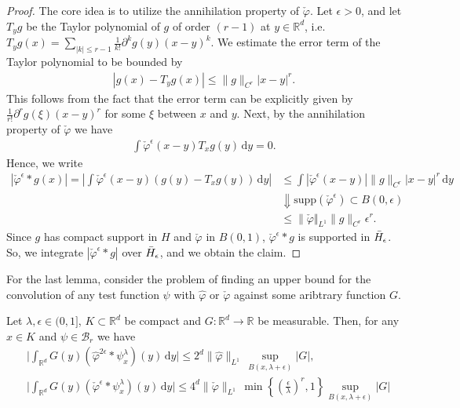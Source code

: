 \begin{proof}
The core idea is to utilize the annihilation property of \(\check \varphi\). Let \(\epsilon > 0\), and let \(T_y g\) be the Taylor polynomial of \(g\) of order \((r-1)\) at \(y \in \mathbb{R}^d\), i.e. \(T_y g(x) = \sum\limits_{|k| \leq r - 1}\frac{1}{k!}\partial^k g(y)(x-y)^k\). We estimate the error term of the Taylor polynomial to be bounded by 
\begin{align*}
    |g(x) - T_y g(x)| \leq \lVert g \rVert_{C^r} |x-y|^r.
\end{align*}
This follows from the fact that the error term can be explicitly given by \(\frac{1}{r!}\partial^{r}g(\xi)(x - y)^r\) for some \(\xi\) between \(x\) and \(y\). Next, by the annihilation property of \(\check \varphi\) we have 
\begin{align*}
    \int\check \varphi^{\epsilon}(x - y)T_{x} g(y)  \, \mathrm{d}y = 0.
\end{align*}
Hence, we write 
\begin{align*}
        |\check \varphi^{\epsilon}* g(x)|  = \left|  \int\check \varphi^{\epsilon}(x - y) (g(y) - T_x g(y) )  \, \mathrm{d}y \right|
        &\leq \int |\check \varphi^{ \epsilon }(x-y)| \lVert g \rVert_{C^r} |x-y|^r \, \mathrm{d}y \\
        &\Downarrow \text{\(\mathrm{supp}(\check \varphi^{\epsilon}) \subset B(0,\epsilon)\)} \\
        &\leq \lVert \check \varphi \Vert_{L^1 } \lVert g \rVert_{C^r} \epsilon^r.
\end{align*}
Since \(g\) has compact support in \(H\) and \(\check \varphi\) in \(B(0,1)\), \(\check \varphi^{\epsilon}* g\) is supported in \(\bar{H}_{\epsilon}\). So, we integrate \(|\check \varphi^{\epsilon}* g|\) over \(\bar{H}_{\epsilon}\), and we obtain the claim.
\end{proof}

For the last lemma, consider the problem of finding an upper bound for the convolution of any test function \(\psi\) with \(\hat \varphi\) or \(\check \varphi\) against some aribtrary function \(G\).   

\begin{lemma}\label{lemma:WALFANGER}
    Let \(\lambda, \epsilon \in (0,1]\), \(K \subset \mathbb{R}^d\) be compact and \(G: \mathbb{R}^d \to \mathbb{R}\) be measurable. Then, for any \(x \in K\) and \(\psi \in \mathcal{B}_r\) we have 
    \begin{align} 
        &\Big| \int_{\mathbb{R}^d} G(y) \left( \hat \varphi^{2\epsilon} * \psi^\lambda_x \right) (y) \, \mathrm{d}y \Big| \leq 2^d \lVert \hat \varphi \rVert_{L^1} \, \sup_{B(x, \lambda + \epsilon)}|G|, \\
        &\Big| \int_{\mathbb{R}^d} G(y) \left( \check \varphi^{\epsilon} * \psi^\lambda_x \right) (y) \, \mathrm{d}y \Big| \leq 4^d \lVert \check \varphi \rVert_{L^1} \, \min\left\{ \left(\frac{\epsilon}{\lambda}\right)^r, 1 \right\}  \sup_{B(x, \lambda + \epsilon)}|G| \label{eq:WALFANGER}
    \end{align}  
\end{lemma}

